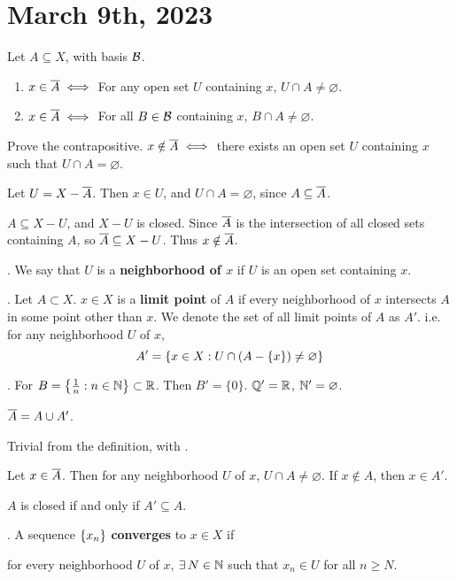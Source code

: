 \section*{March 9th, 2023}

 Let \(A \subseteq X\), with basis \(\mathcal{B}\).
\begin{enumerate}
    \item \(x \in \overline{A} \iff\) For any open set \(U\) containing \(x\), \(U \cap A \neq \varnothing\).
          \item\(x \in \overline{A} \iff\) For all \(B \in \mathcal{B}\) containing \(x\), \(B \cap A \neq \varnothing\).
\end{enumerate}

\pf {} Prove the contrapositive. \(x \notin \overline{A} \iff\) there exists an open set \(U\) containing \(x\) such that \(U \cap A = \varnothing\).

\note{\mimp} Let \(U = X - \overline{A}\). Then \(x \in U\), and \(U \cap A = \varnothing\), since \(A \subseteq \overline{A}\).

\note{\mimpd} \(A \subseteq X - U\), and \(X - U\) is closed. Since \(\overline{A}\) is the intersection of all closed sets containing \(A\), so \(\overline{A} \subseteq X - U\). Thus \(x \notin \overline{A}\).

. We say that \(U\) is a \textbf{neighborhood of \(x\)} if \(U\) is an open set containing \(x\).

.  Let \(A \subset X\). \(x \in X\) is a \textbf{limit point} of \(A\) if every neighborhood of \(x\) intersects \(A\) in some point other than \(x\). We denote the set of all limit points of \(A\) as \(A'\). i.e. for any neighborhood \(U\) of \(x\),
\[
    A' = \{x \in X : U \cap \left( A - \{x\} \right) \neq \varnothing\}
\]


\ex. For \(B = \left\{\frac{1}{n} : n \in \mathbb{N}\right\} \subset \mathbb{R}\). Then \(B' = \{0\}\). \(\mathbb{Q}' = \mathbb{R}\), \(\mathbb{N}' = \varnothing\).

 \(\overline{A} = A \cup A'\).

\pf \note{\(\supset\)} Trivial from the definition, with .

\note{\(\subset\)} Let \(x \in \overline{A}\). Then for any neighborhood \(U\) of \(x\), \(U \cap A \neq \varnothing\). If \(x \notin A\), then \(x \in A'\).

 \(A\) is closed if and only if \(A' \subseteq A\).

. A sequence \(\left\{ x_n \right\}\) \textbf{converges} to \(x \in X\) if
\begin{center}
    for every neighborhood \(U\) of \(x\), \(\exists N \in \N\) such that \(x _n \in U\) for all \(n \geq N\).
\end{center}

